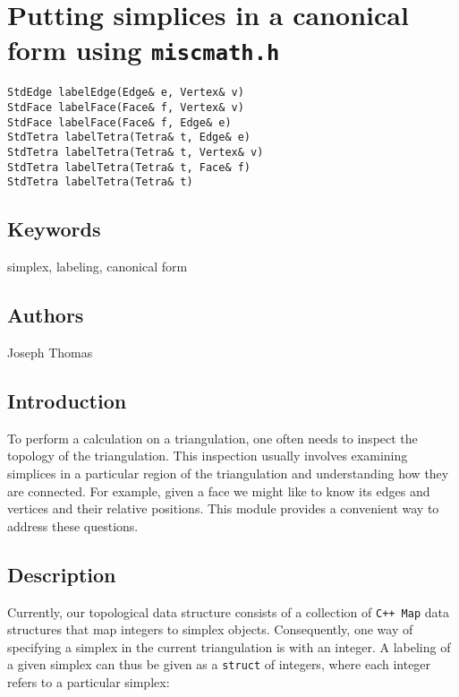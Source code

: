 \documentclass[12pt]{article}%
\begin{document}

\section*{Putting simplices in a canonical form using \texttt{miscmath.h}}

\label{f0}\begin{verbatim} 
StdEdge labelEdge(Edge& e, Vertex& v)
StdFace labelFace(Face& f, Vertex& v)
StdFace labelFace(Face& f, Edge& e)
StdTetra labelTetra(Tetra& t, Edge& e)
StdTetra labelTetra(Tetra& t, Vertex& v)
StdTetra labelTetra(Tetra& t, Face& f)
StdTetra labelTetra(Tetra& t)
\end{verbatim}

\subsection*{Keywords}

simplex, labeling, canonical form

\subsection*{Authors}

Joseph Thomas

\subsection*{Introduction}

To perform a calculation on a triangulation, one often needs to inspect the topology of the triangulation. This inspection usually involves examining simplices in a particular region of the triangulation and understanding how they are connected. For example, given a face we might like to know its edges and vertices and their relative positions. This module provides a convenient way to address these questions.

\subsection*{Description}

Currently, our topological data structure consists of a collection of \texttt{C++ Map} data structures that map integers to simplex objects. Consequently, one way of specifying a simplex in the current triangulation is with an integer. A labeling of a given simplex can thus be given as a \texttt{struct} of integers, where each integer refers to a particular simplex:
\end{document}
